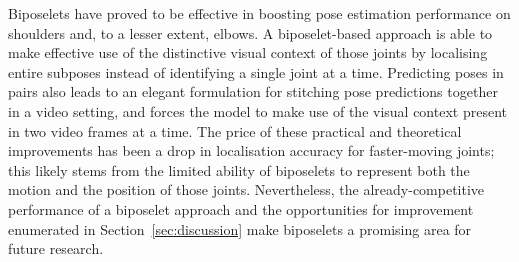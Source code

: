 \documentclass[runningheads]{llncs}
\newif\ifaccvfinal{}
\begin{document}
Biposelets have proved to be effective in boosting pose estimation performance
on shoulders and, to a lesser extent, elbows. A biposelet-based approach is able
to make effective use of the distinctive visual context of those joints by
localising entire subposes instead of identifying a single joint at a time.
Predicting poses in pairs also leads to an elegant formulation for stitching
pose predictions together in a video setting, and forces the model to make use
of the visual context present in two video frames at a time. The price of
these practical and theoretical improvements has been a drop in localisation
accuracy for faster-moving joints; this likely stems from the limited ability of
biposelets to represent both the motion and the position of those joints.
Nevertheless, the already-competitive performance of a biposelet approach and
the opportunities for improvement enumerated in Section~\ref{sec:discussion}
make biposelets a promising area for future research.

\ifaccvfinal
\section*{Acknowledgments}

I would like to thank various authors whose code I have used to produce baseline
comparisons~\cite{pfister2015flowing,chen2014articulated,cherian2014mixing}. I
would also like to thank Anoop Cherian for informing many of the ideas presented
here and giving extensive feedback on drafts of this paper.
\fi



\end{document}
